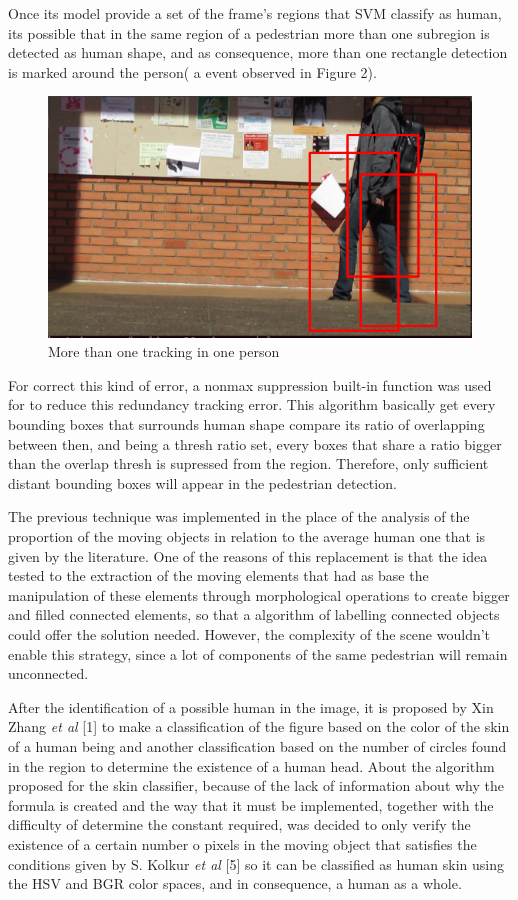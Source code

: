 \documentclass[conference]{IEEEtran}
\begin{document}
	Once its model provide a set of the frame's regions that SVM classify as human, its possible that in the same region of a pedestrian more than one subregion is detected as human shape, and as consequence, more than one rectangle detection is marked around the person( a event observed in Figure 2).
	
	\begin{figure}[htbp]
	\centerline{\includegraphics[scale=0.5]{Non_max.png}}
	\caption{More than one tracking in one person}
	\label{fig}
	\end{figure}
	
	For correct this kind of error, a nonmax suppression built-in function was used for to reduce this redundancy tracking error. This algorithm basically get every bounding boxes that surrounds human shape compare its ratio of overlapping between then, and being a thresh ratio set, every boxes that share a ratio bigger than the overlap thresh is supressed from the region. Therefore, only sufficient distant bounding boxes will appear in the pedestrian detection.
	
	The previous technique was implemented in the place of the analysis of the proportion of the moving objects in relation to the average human one that is given by the literature. One of the reasons of this replacement is that the idea tested to the extraction of the moving elements that had as base the manipulation of these elements through morphological operations to create bigger and filled connected elements, so that a algorithm of labelling connected objects could offer the solution needed. However, the complexity of the scene wouldn't enable this strategy, since a lot of components of the same pedestrian will remain unconnected.
	
	After the identification of a possible human in the image, it is proposed by Xin Zhang \textit{et al} [1] to make a classification of the figure based on the color of the skin of a human being and another classification based on the number of circles found in the region to determine the existence of a human head. About the algorithm proposed for the skin classifier, because of the lack of information about why the formula is created and the way that it must be implemented, together with the difficulty of determine the constant required, was decided to only verify the existence of a certain number o pixels in the moving object that satisfies the conditions given by S. Kolkur \textit{et al} [5] so it can be classified as human skin using the HSV and BGR color spaces, and in consequence, a human as a whole.
	
\end{document}
